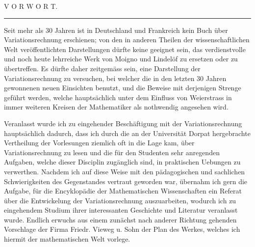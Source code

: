\documentclass[11pt,a4paper,leqno]{article}
\begin{document}
\begin{center}
{\Large V O R W O R T.}\par
\vspace{2mm}\rule{25mm}{0.4pt}\par
\end{center}

Seit mehr als 30 Jahren ist in Deutschland und Frankreich kein Buch über Variationsrechnung erschienen; von den in anderen Theilen der wissenschaftlichen Welt veröffentlichten Darstellungen dürfte keine geeignet sein, das verdienstvolle und noch heute lehrreiche Werk von Moigno und Lindelöf zu ersetzen oder zu übertreffen. Es dürfte daher zeitgemäss sein, eine Darstellung der Variationsrechnung zu versuchen, bei welcher die in den letzten 30 Jahren gewonnenen neuen Einsichten benutzt, und die Beweise mit derjenigen Strenge geführt werden, welche hauptsächlich unter dem Einfluss von Weierstrass in immer weiteren Kreisen der Mathematiker als nothwendig angesehen wird.

Veranlasst wurde ich zu eingehender Beschäftigung mit der Variationsrechnung hauptsächlich dadurch, dass ich durch die an der Universität Dorpat hergebrachte Vertheilung der Vorlesungen ziemlich oft in die Lage kam, über Variationsrechnung zu lesen und die für den Studenten sehr anregenden Aufgaben, welche dieser Disciplin zugänglich sind, in praktischen Uebungen zu verwerthen. Nachdem ich auf diese Weise mit den pädagogischen und sachlichen Schwierigkeiten des Gegenstandes vertraut geworden war, übernahm ich gern die Aufgabe, für die Encyklopädie der Mathematischen Wissenschaften ein Referat über die Entwickelung der Variationsrechnung auszuarbeiten, wodurch ich zu eingehendem Studium ihrer interessanten Geschichte und Literatur veranlasst wurde. Endlich erwuchs aus einem zunächst nach anderer Richtung gehenden Vorschlage der Firma Friedr. Vieweg u. Sohn der Plan des Werkes, welches ich hiermit der mathematischen Welt vorlege.
\end{document}
